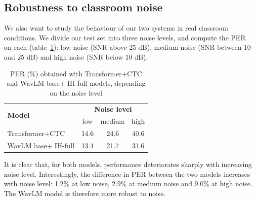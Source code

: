 \documentclass{Interspeech2024}
\begin{document}


\vspace{-0.2cm}
\subsection{Robustness to classroom noise}
We also want to study the behaviour of our two systems in real classroom conditions. We divide our test set into three noise levels, and compute the PER on each (table~\ref{tab:noise}): low noise (SNR above 25 dB), medium noise (SNR between 10 and 25 dB) and high noise (SNR below 10 dB).

\vspace{-0.2cm}
\begin{table}[!htb]
    \centering
    \caption{PER (\%) obtained with Transformer+CTC and WavLM base+ IH-full models, depending on the noise level}
	\begin{tabular}{|l|c c c|}
    \hline
	\multirow{2}{*}{\textbf{Model}} & \multicolumn{3}{c|}{\textbf{Noise level}} \\
    & low & medium & high \\
    \hline
    Transformer+CTC & 14.6 & 24.6 & 40.6 \\
    WavLM base+ IH-full & 13.4 & 21.7 & 31.6 \\
    \hline
	\end{tabular}
    \label{tab:noise}
\end{table}
\vspace{-0.2cm}
It is clear that, for both models, performance deteriorates sharply with increasing noise level. Interestingly, the difference in PER between the two models increases with noise level: 1.2\% at low noise, 2.9\% at medium noise and 9.0\% at high noise. The WavLM model is therefore more robust to noise. 
\end{document}
